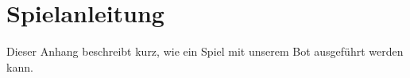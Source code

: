 \chapter{Spielanleitung}
\label{chap:spielanleitung}

Dieser Anhang beschreibt kurz, wie ein Spiel mit unserem Bot ausgef\"uhrt werden kann.

